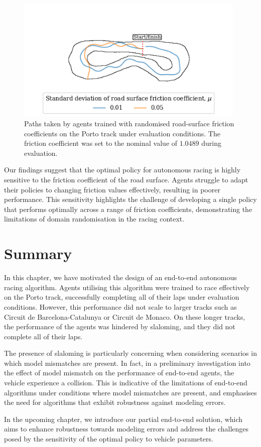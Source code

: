 \begin{figure}[htb!]
    \centering
    \includegraphics[width=11cm]{contents/chapt5/figs/domain_random/porto_domain_random.png}
    \caption[Paths taken by agents trained with randomised road-surface friction coefficients on the Porto track under evaluation conditions]{Paths taken by agents trained with randomised road-surface friction coefficients on the Porto track under evaluation conditions. The friction coefficient was set to the nominal value of $1.0489$ during evaluation.}
    \label{fig:porto_domain_random}
\end{figure}


Our findings suggest that the optimal policy for autonomous racing is highly sensitive to the friction coefficient of the road surface. 
Agents struggle to adapt their policies to changing friction values effectively, resulting in poorer performance. 
This sensitivity highlights the challenge of developing a single policy that performs optimally across a range of friction coefficients, demonstrating the limitations of domain randomisation in the racing context.



\section{Summary}

In this chapter, we have motivated the design of an end-to-end autonomous racing algorithm.
Agents utilising this algorithm were trained to race effectively on the Porto track, successfully completing all of their laps under evaluation conditions.
However, this performance did not scale to larger tracks such as Circuit de Barcelona-Catalunya or Circuit de Monaco.
On these longer tracks, the performance of the agents was hindered by slaloming, and they did not complete all of their laps.

The presence of slaloming is particularly concerning when considering scenarios in which model mismatches are present.
In fact, in a preliminary investigation into the effect of model mismatch on the performance of end-to-end agents, the vehicle experience a collision.
This is indicative of the limitations of end-to-end algorithms under conditions where model mismatches are present, and emphasises the need for algorithms that exhibit robustness against modeling errors.

In the upcoming chapter, we introduce our partial end-to-end solution, which aims to enhance robustness towards modeling errors and address the challenges posed by the sensitivity of the optimal policy to vehicle parameters.